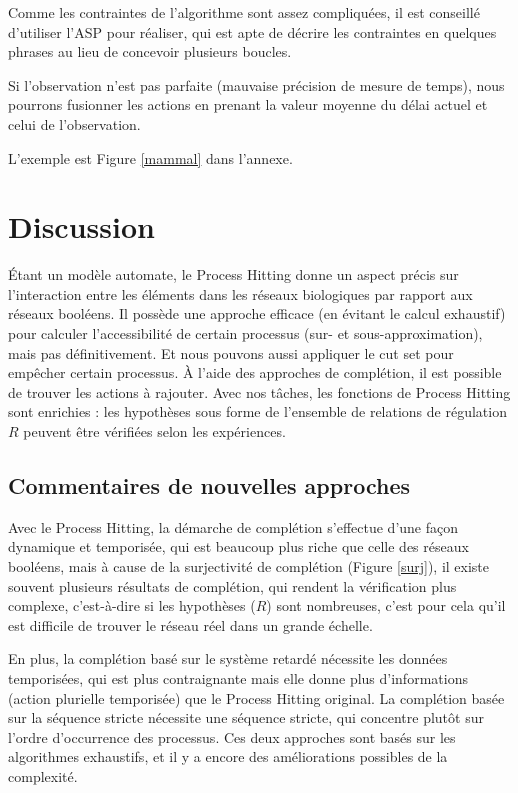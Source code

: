 \documentclass[11pt]{report}
\theoremstyle{definition}
\begin{document}
Comme les contraintes de l'algorithme sont assez compliqu\'ees, il est conseill\'e d'utiliser l'ASP pour r\'ealiser, qui est apte de d\'ecrire les contraintes en quelques phrases au lieu de concevoir plusieurs boucles.

Si l'observation n'est pas parfaite (mauvaise pr\'ecision de mesure de temps), nous pourrons fusionner les actions en prenant la valeur moyenne du d\'elai actuel et celui de l'observation.

L'exemple est Figure \ref{mammal} dans l'annexe. 

\chapter{Discussion}
\'Etant un mod\`ele automate, le Process Hitting donne un aspect pr\'ecis sur l'interaction entre les \'el\'ements dans les r\'eseaux biologiques par rapport aux r\'eseaux bool\'eens. Il poss\`ede une approche efficace (en \'evitant le calcul exhaustif) pour calculer l'accessibilit\'e de certain processus (sur- et sous-approximation), mais pas d\'efinitivement. Et nous pouvons aussi appliquer le cut set pour emp\^echer certain processus. \`A l'aide des approches de compl\'etion, il est possible de trouver les actions \`a rajouter. Avec nos t\^aches, les fonctions de Process Hitting sont enrichies : les hypoth\`eses sous forme de l'ensemble de relations de r\'egulation $R$ peuvent \^etre v\'erifi\'ees selon les exp\'eriences.

\section{Commentaires de nouvelles approches}
Avec le Process Hitting, la d\'emarche de compl\'etion s'effectue d'une fa\c con dynamique et temporis\'ee, qui est beaucoup plus riche que celle des r\'eseaux bool\'eens, mais \`a cause de la surjectivit\'e de compl\'etion (Figure \ref{surj}), il existe souvent plusieurs r\'esultats de compl\'etion, qui rendent la v\'erification plus complexe, c'est-\`a-dire si les hypoth\`eses ($R$) sont nombreuses, c'est pour cela qu'il est difficile de trouver le r\'eseau r\'eel dans un grande \'echelle.

En plus, la compl\'etion bas\'e sur le syst\`eme retard\'e n\'ecessite les donn\'ees temporis\'ees, qui est plus contraignante mais elle donne plus d'informations (action plurielle temporis\'ee) que le Process Hitting original. La compl\'etion bas\'ee sur la s\'equence stricte n\'ecessite une s\'equence stricte, qui concentre plut\^ot sur l'ordre d'occurrence des processus. Ces deux approches sont bas\'es sur les algorithmes exhaustifs, et il y a encore des am\'eliorations possibles de la complexit\'e.
\end{document}
